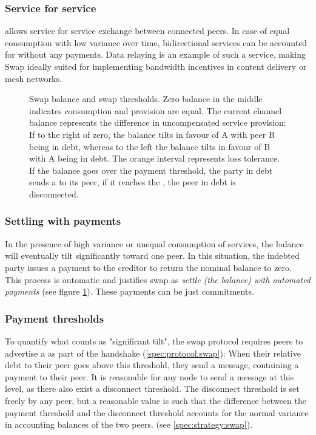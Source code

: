 \subsubsection{Service for service}

 allows service for service exchange between connected peers. In case of equal consumption with low variance over time, bidirectional services can be accounted for without any payments. Data relaying is an example of such a service, making Swap ideally suited for implementing bandwidth incentives in content delivery or mesh networks.

\begin{figure}[htbp]

\caption[Swap balance and swap thresholds \statusgreen]{Swap balance and swap thresholds.
Zero balance in the middle indicates consumption and provision are equal.
The current channel balance represents the difference in uncompensated service provision:
If to the right of zero, the balance tilts in favour of A with peer B being in debt, whereas to the left
the balance tilts in favour of B with A being in debt.
The orange interval represents loss tolerance. If the balance goes over the payment threshold, the party in
debt sends a  to its peer, if it reaches the , the peer in debt is disconnected.}
\label{fig:swap}
\end{figure}

\subsubsection{Settling with payments}

In the presence of high variance or unequal consumption of services, the balance will eventually tilt significantly toward one peer. In this situation, the indebted party issues a payment to the creditor to return the nominal balance to zero. This process is automatic and justifies swap as \emph{settle (the balance) with automated payments} (see figure \ref{fig:swap}). These payments can be just commitments.


\subsubsection{Payment thresholds}

To quantify what counts as "significant tilt", the swap protocol requires peers to advertise a  as part of the handshake (\ref{spec:protocol:swap}): When their relative debt to their peer goes above this threshold, they send a message, containing a payment to their peer. It is reasonable for any node to send a message at this level, as there also exist a disconnect threshold. The disconnect threshold is set freely by any peer, but a reasonable value is such that the difference between the payment threshold and the disconnect threshold accounts for the normal variance in accounting balances of the two peers.   (see \ref{spec:strategy:swap}). 


